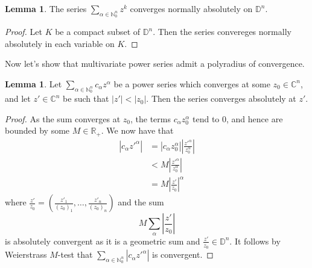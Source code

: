 \documentclass{article}
\theoremstyle{definition}
\newtheorem{lemma}[theorem]{Lemma}
\newcommand{\R}{\mathbb{R}}
\newcommand{\C}{\mathbb{C}}
\newcommand{\N}{\mathbb{N}}
\newcommand{\D}{\mathbb{D}}
\begin{document}
\begin{lemma}
	The series $\sum_{\alpha \in \N_0^{n}} z^{k}$ converges normally absolutely
	on $\D^{n}$.
\end{lemma}
\begin{proof}
	Let $K$ be a compact subset of $\D^{n}$. Then the series convereges
	normally absolutely in each variable on $K$.
\end{proof}

Now let's show that multivariate power series admit a polyradius of convergence.

\begin{lemma}
	Let $\sum_{\alpha \in \N^{n}_0} c_{\alpha} z^{\alpha}$ be a power series
	which converges at some $z_0 \in \C^{n}$, and let $z' \in \C^{n}$ be such
	that $|z'| < |z_0|$. Then the series converges absolutely at $z'$.
\end{lemma}
\begin{proof}
	As the sum converges at $z_0$, the terms $c_{\alpha} z_0^{\alpha}$ tend to
	$0$, and hence are bounded by some $M \in \R_{+}$. We now have that 
	\begin{align*}
		|c_{\alpha} z'^{\alpha}|
		&=
		|c_{\alpha}z_0^{\alpha}|\left|\frac{z'^{\alpha}}{z_0^{\alpha}}\right| \\
		&<
		M \left|\frac{z'^{\alpha}}{z_0^{\alpha}}\right| \\
		&=
		M \left|\frac{z'}{z_0}\right|^{\alpha}
	\end{align*}
	where $\frac{z'}{z_0} = \left(\frac{z'_1}{(z_0)_1}, \ldots,
	\frac{z'_n}{(z_0)_n}\right)$ and the sum
	\[
		M \sum_{\alpha} \left|\frac{z'}{z_0}\right|
	\] 
	is absolutely convergent as it is a geometric sum and $\frac{z'}{z_0} \in
	\D^{n}$. It follows by Weierstrass $M$-test that 
	$\sum_{\alpha \in \N^{n}_0} \left|c_{\alpha} z'^{\alpha}\right|$
	is convergent.
\end{proof}
\end{document}
